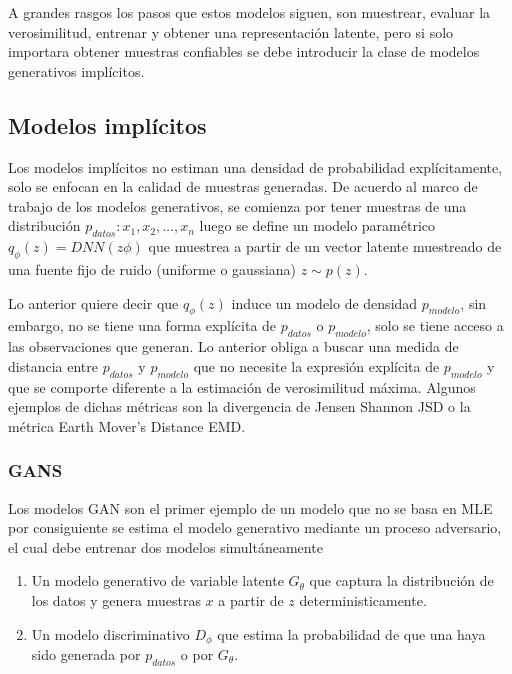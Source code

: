 A grandes rasgos los pasos que estos modelos siguen, son muestrear, evaluar la verosimilitud, entrenar y obtener una representación latente, pero si solo importara obtener muestras confiables se debe introducir la clase de modelos generativos implícitos.

\subsection{Modelos implícitos}

Los modelos implícitos no estiman una densidad de probabilidad explícitamente, solo se enfocan en la calidad de muestras generadas. De acuerdo al marco de trabajo de los modelos generativos, se comienza por tener muestras de una distribución \(p_{datos}: x_1 , x_2 , \dots , x_n \) luego se define un modelo paramétrico $q_\phi (z) = DNN(z \phi)$ que muestrea a partir de un vector latente muestreado de una fuente fijo de ruido (uniforme o gaussiana) $z \sim   p(z)$.

Lo anterior quiere decir que $q_\phi (z)$ induce un modelo de densidad $p_{modelo}$, sin embargo, no se tiene una forma explícita de $p_{datos}$ o $p_{modelo}$, solo se tiene acceso a las observaciones que generan. Lo anterior obliga a buscar una medida de distancia entre  $p_{datos}$ y $p_{modelo}$ que no necesite la expresión explícita de $p_{modelo}$ y que se comporte diferente a la estimación de verosimilitud máxima. Algunos ejemplos de dichas métricas son la divergencia de Jensen Shannon JSD o la métrica Earth Mover’s Distance EMD.

\subsubsection{GANS}

Los modelos GAN son el primer ejemplo de un modelo que no se basa en MLE por consiguiente se estima el modelo generativo mediante un proceso adversario, el cual debe entrenar dos modelos simultáneamente
\begin{enumerate}[label=\alph*)]
	\item Un modelo generativo de variable latente $G_\theta$ que captura la distribución de los datos y genera muestras $x$ a partir de $z$ deterministicamente.
	\item Un modelo discriminativo $D_\phi$ que estima la probabilidad de que una haya sido generada por $p_{datos}$ o por $G_\theta$.
\end{enumerate}


